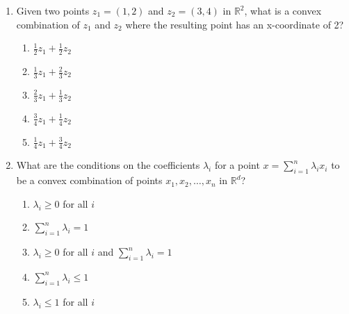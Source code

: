 \documentclass{article}%
\begin{document}
\begin{enumerate}
\begin{enumerate}%
\item Carathéodory's Theorem states that any point in the convex hull of a set in $\mathbb{R}^m$ can be expressed as a convex combination of at most $m$ points from the set. This is significant because it limits the number of points needed to represent any point in the convex hull, improving computational efficiency in linear programming.%
\item Carathéodory's Theorem states that any point in the convex hull of a set in $\mathbb{R}^m$ can be expressed as a convex combination of at most $m+1$ points from the set. This is significant because it limits the number of points needed to represent any point in the convex hull, improving computational efficiency in linear programming.%
\item Carathéodory's Theorem states that any point in a convex set can be expressed as a convex combination of its extreme points. This is significant because it simplifies the representation of convex sets in linear programming.%
\item Carathéodory's Theorem is unrelated to linear programming.%
\item Carathéodory's Theorem states that any point in the convex hull of a set can be expressed as a convex combination of all points in the set. This is significant because it provides a complete characterization of the convex hull.%
\end{enumerate}%
\vspace{1em}%
\item Given two points $z_1 = (1, 2)$ and $z_2 = (3, 4)$ in $\mathbb{R}^2$, what is a convex combination of $z_1$ and $z_2$ where the resulting point has an x-coordinate of 2?%
\begin{enumerate}%
\item $\frac{1}{2}z_1 + \frac{1}{2}z_2$%
\item $\frac{1}{3}z_1 + \frac{2}{3}z_2$%
\item $\frac{2}{3}z_1 + \frac{1}{3}z_2$%
\item $\frac{3}{4}z_1 + \frac{1}{4}z_2$%
\item $\frac{1}{4}z_1 + \frac{3}{4}z_2$%
\end{enumerate}%
\vspace{1em}%
\item What are the conditions on the coefficients $\lambda_i$ for a point $x = \sum_{i=1}^n \lambda_i x_i$ to be a convex combination of points $x_1, x_2, \dots, x_n$ in $\mathbb{R}^d$?%
\begin{enumerate}%
\item $\lambda_i \ge 0$ for all $i$%
\item $\sum_{i=1}^n \lambda_i = 1$%
\item $\lambda_i \ge 0$ for all $i$ and $\sum_{i=1}^n \lambda_i = 1$%
\item $\sum_{i=1}^n \lambda_i \le 1$%
\item $\lambda_i \le 1$ for all $i$%
\end{enumerate}%
\vspace{1em}%
\end{enumerate}
\end{document}
